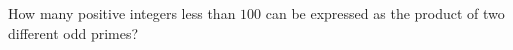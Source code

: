 How many positive integers less than $100$ can be expressed as the product of two different odd primes?
